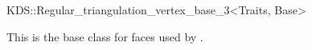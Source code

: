 

\begin{ccRefClass}{KDS::Regular_triangulation_vertex_base_3<Traits, Base>}  %


\ccDefinition
  
This is the base class for faces used by .



\end{ccRefClass}


